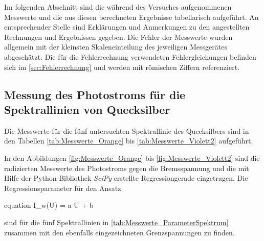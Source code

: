 Im folgenden Abschnitt sind die während des Versuches aufgenommenen Messwerte und die 
aus diesen berechneten Ergebnisse tabellarisch aufgeführt. An entsprechender Stelle
sind Erklärungen und Anmerkungen zu den angestellten Rechnungen und Ergebnissen gegeben.
Die Fehler der Messwerte wurden allgemein mit der kleinsten Skaleneinteilung des jeweiligen 
Messgerätes abgeschätzt.
Die für die Fehlerrechnung verwendeten Fehlergleichungen befinden sich im \cref{sec:Fehlerrechnung}
und werden mit römischen Ziffern referenziert.


\subsection{Messung des Photostroms für die Spektrallinien von Quecksilber}

		
		Die Messwerte für die fünf untersuchten Spektrallinie des Quecksilbers sind
		in den Tabellen \ref{tab:Messwerte_Orange} bis \ref{tab:Messwerte_Violett2} aufgeführt.
		
		
		
		
		
		
		
		In den Abbildungen \ref{fig:Messwerte_Orange} bis \ref{fig:Messwerte_Violett2} sind die 
		radizierten Messwerte des Photostroms gegen die Bremsspannung und die 
		mit Hilfe der Python-Bibliothek \emph{SciPy} \cite{SciPy} erstellte Regressiongerade 
		eingetragen. 
		Die Regressionsparameter für den Ansatz
		\begin{empheq}{equation}
			I_{w}(U) = a \cdot U + b
		\end{empheq}
		sind für die fünf Spektrallinien in \cref{tab:Messwerte_ParameterSpektrum} zusammen mit  
		den ebenfalls eingezeichneten Grenzspannungen zu finden.
		
		
		

